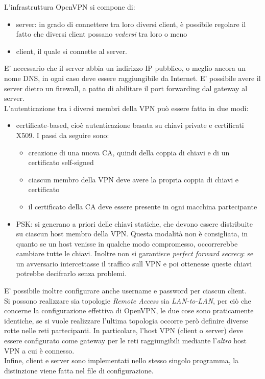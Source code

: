 L'infrastruttura OpenVPN si compone di:
\begin{itemize}
  \item server: in grado di connettere tra loro diversi client, è possibile regolare
  il fatto che diversi client possano \textit{vedersi} tra loro o meno
  \item client, il quale si connette al server.
\end{itemize}
E' necessario che il server abbia un indirizzo IP pubblico, o meglio ancora un nome DNS, in ogni caso deve
essere raggiungibile da Internet.
E' possibile avere il server dietro un firewall, a patto di abilitare il port forwarding dal gateway al server.\\
L'autenticazione tra i diversi membri della VPN può essere fatta in due modi:
\begin{itemize}
  \item certificate-based, cioè autenticazione basata su chiavi private e certificati
  X509. I passi da seguire sono:
  \begin{itemize}
    \item creazione di una nuova CA, quindi della coppia di chiavi e di un certificato
    self-signed
    \item ciascun membro della VPN deve avere la propria coppia di chiavi e certificato
    \item il certificato della CA deve essere presente in ogni macchina partecipante
  \end{itemize}
  \item PSK: si generano a priori delle chiavi statiche, che devono essere distribuite
  su ciascun host membro della VPN. Questa modalità non è consigliata, in quanto
  se un host venisse in qualche modo compromesso, occorrerebbe cambiare tutte le chiavi.
  Inoltre non si garantisce \textit{perfect forward secrecy}: se un avversario
  intercettasse il traffico sull VPN e poi ottenesse queste chiavi potrebbe
  decifrarlo senza problemi.
\end{itemize}
E' possibile inoltre configurare anche username e password per ciascun client.\\
Si possono realizzare sia topologie \textit{Remote Access} sia \textit{LAN-to-LAN},
per ciò che concerne la configurazione effettiva di OpenVPN, le due cose
sono praticamente identiche, se si vuole realizzare l'ultima topologia occorre
però definire diverse rotte nelle reti partecipanti. In particolare,
l'host VPN (client o server) deve essere configurato come gateway per le reti
raggiungibili mediante l'\textit{altro} host VPN a cui è connesso.\\
Infine, client e server sono implementati
nello stesso singolo programma, la distinzione viene fatta nel file di configurazione.


